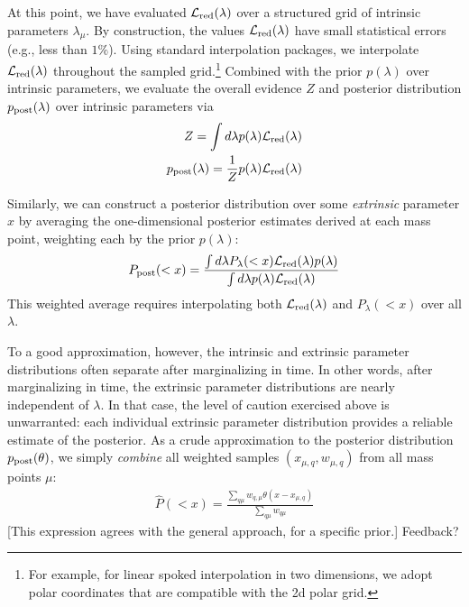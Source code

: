 At this point, we have evaluated ${\cal L}_{\rm red}(\lambda)$ over a structured grid of intrinsic parameters $\lambda_\mu$.  
%
By construction,  the values ${\cal L}_{\rm red}(\lambda)$ have small statistical errors (e.g., less than $1\%$).   Using standard
interpolation packages, we interpolate ${\cal L}_{\rm red}(\lambda)$ throughout the sampled grid.\footnote{For example, for linear
spoked interpolation in two dimensions, we adopt polar coordinates that are compatible with the 2d polar grid.}
%
Combined with the prior $p(\lambda)$ over intrinsic parameters, we evaluate the overall evidence $Z$ and posterior
distribution $p_{\rm post}(\lambda)$ over intrinsic parameters via
\begin{eqnarray}
Z = \int d\lambda p(\lambda) {\cal L}_{\rm red}(\lambda) \\
p_{\rm post}(\lambda) = \frac{1}{Z} p(\lambda) {\cal L}_{\rm red}(\lambda)
\end{eqnarray}
%

Similarly, we can construct a posterior distribution over some \emph{extrinsic} parameter $x$ by averaging the one-dimensional posterior estimates derived at
each mass point, weighting each by the prior $p(\lambda)$:
\begin{eqnarray}
P_{\rm post}(<x) = \frac{\int d\lambda P_\lambda(<x) {\cal L}_{\rm red}(\lambda) p(\lambda)}{\int d \lambda p(\lambda) {\cal L}_{\rm red}(\lambda)}
\end{eqnarray}
This weighted average requires interpolating both ${\cal L}_{\rm red}(\lambda)$ and $P_\lambda(<x)$ over all $\lambda$.  


To a good approximation, however, the intrinsic and extrinsic parameter distributions often separate after marginalizing
in time.  In other words, after marginalizing in time, the extrinsic parameter distributions are nearly independent of $\lambda$.  
In that case, the level of caution exercised above is unwarranted:  each individual
extrinsic parameter distribution provides a reliable estimate of the posterior.  As a crude approximation to the posterior distribution $p_{\rm post}(\theta)$, we  simply \emph{combine} all
weighted samples $(x_{\mu,q},w_{\mu,q})$ from all mass points $\mu$:
\begin{eqnarray}
\hat{P}(<x) = \frac{\sum_{q\mu} w_{q,\mu}\theta(x-x_{\mu,q})}{\sum_{q\mu} w_{q\mu}}
\end{eqnarray}
[This expression agrees with the general approach, for a specific prior.]
{\color{blue} Feedback?}


